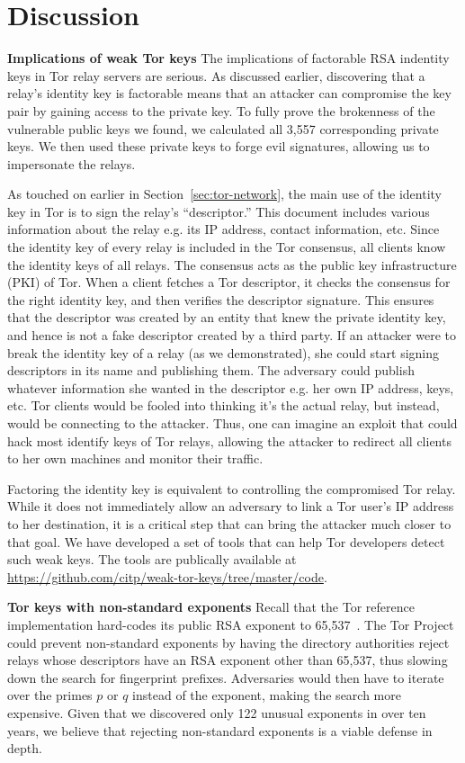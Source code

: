 \section{Discussion}
\label{sec:discussion}
\textbf{Implications of weak Tor keys}
The implications of factorable RSA indentity keys in Tor relay servers are serious. As discussed earlier, discovering that a relay's identity key is factorable means that an attacker can compromise the key pair by gaining access to the private key. To fully prove the brokenness of the vulnerable public keys we found, we calculated all 3,557 corresponding private keys. We then used these private keys to forge evil signatures, allowing us to impersonate the relays.

As touched on earlier in Section~\ref{sec:tor-network}, the main use of the identity key in Tor is to sign the relay's ``descriptor.'' This document includes various information about the relay e.g. its IP address, contact information, etc. Since the identity key of every relay is included in the Tor consensus, all clients know the identity keys of all relays. The consensus acts as the public key infrastructure (PKI) of Tor. When a client fetches a Tor descriptor, it checks the consensus for the right identity key, and then verifies the descriptor signature. This ensures that the descriptor was created by an entity that knew the private identity key, and hence is not a fake descriptor created by a third party. If an attacker were to break the identity key of a relay (as we demonstrated), she could start signing descriptors in its name and publishing them. The adversary could publish whatever information she wanted in the descriptor e.g. her own IP address, keys, etc. Tor clients would be fooled into thinking it's the actual relay, but instead, would be connecting to the attacker. Thus, one can imagine an exploit that could hack most identify keys of Tor relays, allowing the attacker to redirect all clients to her own machines and monitor their traffic.

Factoring the identity key is equivalent to controlling the compromised Tor relay. While it does not immediately allow an adversary to link a Tor user's IP address to her destination, it is a critical step that can bring the attacker much closer to that goal. We have developed a set of tools that can help Tor developers detect such weak keys. The tools are publically available at \url{https://github.com/citp/weak-tor-keys/tree/master/code}.

\textbf{Tor keys with non-standard exponents} Recall that the Tor reference implementation hard-codes its public RSA exponent
to 65,537~\cite[\S~0.3]{torspec}.  The Tor Project could prevent non-standard
exponents by having the directory authorities reject relays whose descriptors
have an RSA exponent other than 65,537, thus slowing down the search for
fingerprint prefixes.  Adversaries would then have to iterate over the primes
$p$ or $q$ instead of the exponent, making the search more expensive.  Given
that we discovered only 122 unusual exponents in over ten years, we believe that
rejecting non-standard exponents is a viable defense in depth.

